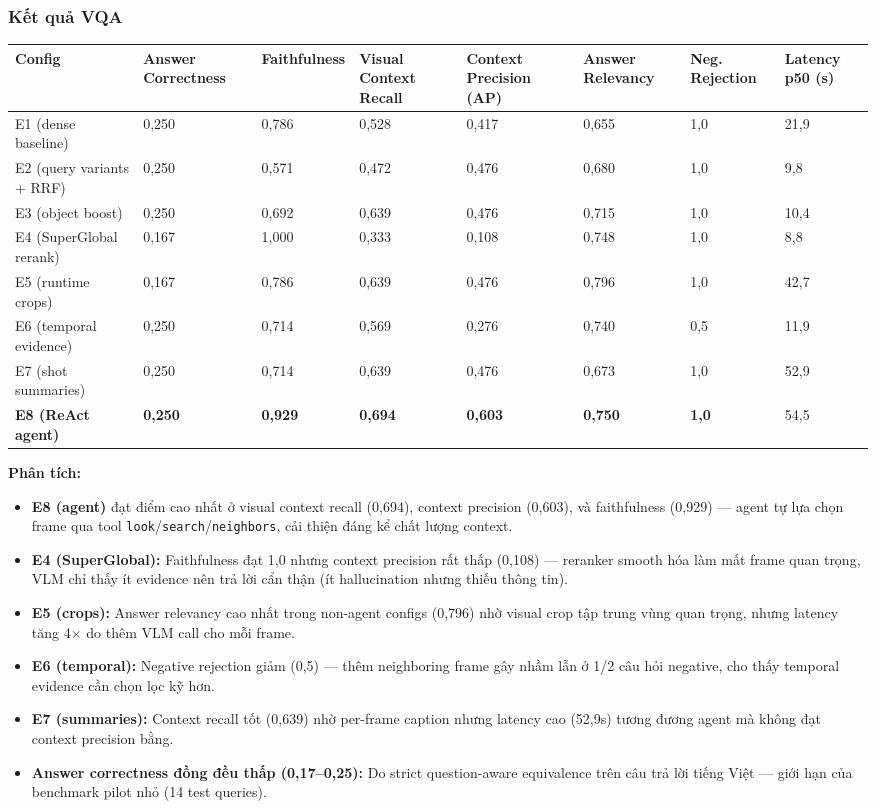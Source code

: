 \documentclass[12pt,a4paper,onecolumn]{article}
\begin{document}
\subsubsection{Kết quả VQA}

\noindent
{\scriptsize
\begin{tabularx}{\textwidth}{Y l l l l l l l}
\toprule
Config & Answer Correctness & Faithfulness & Visual Context Recall & Context Precision (AP) & Answer Relevancy & Neg. Rejection & Latency p50 (s) \\
\midrule
E1 (dense baseline) & 0,250 & 0,786 & 0,528 & 0,417 & 0,655 & 1,0 & 21,9 \\
E2 (query variants + RRF) & 0,250 & 0,571 & 0,472 & 0,476 & 0,680 & 1,0 & 9,8 \\
E3 (object boost) & 0,250 & 0,692 & 0,639 & 0,476 & 0,715 & 1,0 & 10,4 \\
E4 (SuperGlobal rerank) & 0,167 & 1,000 & 0,333 & 0,108 & 0,748 & 1,0 & 8,8 \\
E5 (runtime crops) & 0,167 & 0,786 & 0,639 & 0,476 & 0,796 & 1,0 & 42,7 \\
E6 (temporal evidence) & 0,250 & 0,714 & 0,569 & 0,276 & 0,740 & 0,5 & 11,9 \\
E7 (shot summaries) & 0,250 & 0,714 & 0,639 & 0,476 & 0,673 & 1,0 & 52,9 \\
\textbf{E8 (ReAct agent)} & \textbf{0,250} & \textbf{0,929} & \textbf{0,694} & \textbf{0,603} & \textbf{0,750} & \textbf{1,0} & 54,5 \\
\bottomrule
\end{tabularx}
}


\textbf{Phân tích:}

\begin{itemize}
  \item \textbf{E8 (agent)} đạt điểm cao nhất ở visual context recall (0,694), context precision (0,603), và faithfulness (0,929) — agent tự lựa chọn frame qua tool \texttt{look}/\texttt{search}/\texttt{neighbors}, cải thiện đáng kể chất lượng context.
  \item \textbf{E4 (SuperGlobal):} Faithfulness đạt 1,0 nhưng context precision rất thấp (0,108) — reranker smooth hóa làm mất frame quan trọng, VLM chỉ thấy ít evidence nên trả lời cẩn thận (ít hallucination nhưng thiếu thông tin).
  \item \textbf{E5 (crops):} Answer relevancy cao nhất trong non-agent configs (0,796) nhờ visual crop tập trung vùng quan trọng, nhưng latency tăng 4× do thêm VLM call cho mỗi frame.
  \item \textbf{E6 (temporal):} Negative rejection giảm (0,5) — thêm neighboring frame gây nhầm lẫn ở 1/2 câu hỏi negative, cho thấy temporal evidence cần chọn lọc kỹ hơn.
  \item \textbf{E7 (summaries):} Context recall tốt (0,639) nhờ per-frame caption nhưng latency cao (52,9s) tương đương agent mà không đạt context precision bằng.
  \item \textbf{Answer correctness đồng đều thấp (0,17–0,25):} Do strict question-aware equivalence trên câu trả lời tiếng Việt — giới hạn của benchmark pilot nhỏ (14 test queries).
\end{itemize}
\end{document}
